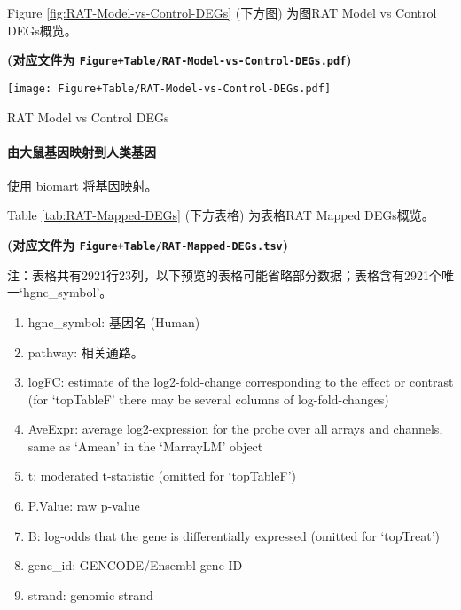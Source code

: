 \documentclass[
]{article}
\providecommand{\tightlist}{%
  \setlength{\itemsep}{0pt}\setlength{\parskip}{0pt}}
\begin{document}
Figure \ref{fig:RAT-Model-vs-Control-DEGs} (下方图) 为图RAT Model vs Control DEGs概览。

\textbf{(对应文件为 \texttt{Figure+Table/RAT-Model-vs-Control-DEGs.pdf})}

\def\@captype{figure}
\begin{center}
\texttt{[image: Figure+Table/RAT-Model-vs-Control-DEGs.pdf]}
\caption{RAT Model vs Control DEGs}\label{fig:RAT-Model-vs-Control-DEGs}
\end{center}

\hypertarget{ux7531ux5927ux9f20ux57faux56e0ux6620ux5c04ux5230ux4ebaux7c7bux57faux56e0}{%
\paragraph{由大鼠基因映射到人类基因}\label{ux7531ux5927ux9f20ux57faux56e0ux6620ux5c04ux5230ux4ebaux7c7bux57faux56e0}}

使用 biomart 将基因映射。

Table \ref{tab:RAT-Mapped-DEGs} (下方表格) 为表格RAT Mapped DEGs概览。

\textbf{(对应文件为 \texttt{Figure+Table/RAT-Mapped-DEGs.tsv})}

\begin{center}\begin{tcolorbox}[colback=gray!10, colframe=gray!50, width=0.9\linewidth, arc=1mm, boxrule=0.5pt]注：表格共有2921行23列，以下预览的表格可能省略部分数据；表格含有2921个唯一`hgnc\_symbol'。
\end{tcolorbox}
\end{center}
\begin{center}\begin{tcolorbox}[colback=gray!10, colframe=gray!50, width=0.9\linewidth, arc=1mm, boxrule=0.5pt]\begin{enumerate}\tightlist
\item hgnc\_symbol:  基因名 (Human)
\item pathway:  相关通路。
\item logFC:  estimate of the log2-fold-change corresponding to the effect or contrast (for ‘topTableF’ there may be several columns of log-fold-changes)
\item AveExpr:  average log2-expression for the probe over all arrays and channels, same as ‘Amean’ in the ‘MarrayLM’ object
\item t:  moderated t-statistic (omitted for ‘topTableF’)
\item P.Value:  raw p-value
\item B:  log-odds that the gene is differentially expressed (omitted for ‘topTreat’)
\item gene\_id:  GENCODE/Ensembl gene ID
\item strand:  genomic strand
\end{enumerate}\end{tcolorbox}
\end{center}
\end{document}
